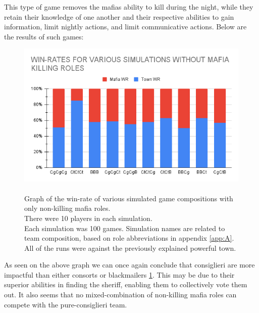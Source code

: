 This type of game removes the mafias ability to kill during the night, while
they retain their knowledge of one another and their respective abilities to
gain information, limit nightly actions, and limit communicative actions. Below
are the results of such games:
\begin{figure}[H]
    \includegraphics[width=1\linewidth]{figures/Winrates_NonKilling}
    \caption{\\Graph of the win-rate of various simulated game compositions
        with only non-killing mafia roles.\\
        There were 10 players in each simulation.\\
        Each simulation was 100 games.
        Simulation names are related to team composition, based on role
        abbreviations in appendix \ref{app:A}.\\
        All of the runs were against the previously explained powerful town.}
    \label{fig:VariousSimulationsNonKilling}
\end{figure}
\vspace{-5px} As seen on the above graph we can once again conclude that
consiglieri are more impactful than either consorts or blackmailers \ref{fig:VariousSimulationsNonKilling}. This may
be due to their superior abilities in finding the sheriff, enabling them to
collectively vote them out. It also seems that no mixed-combination of
non-killing mafia roles can compete with the pure-consiglieri team.
